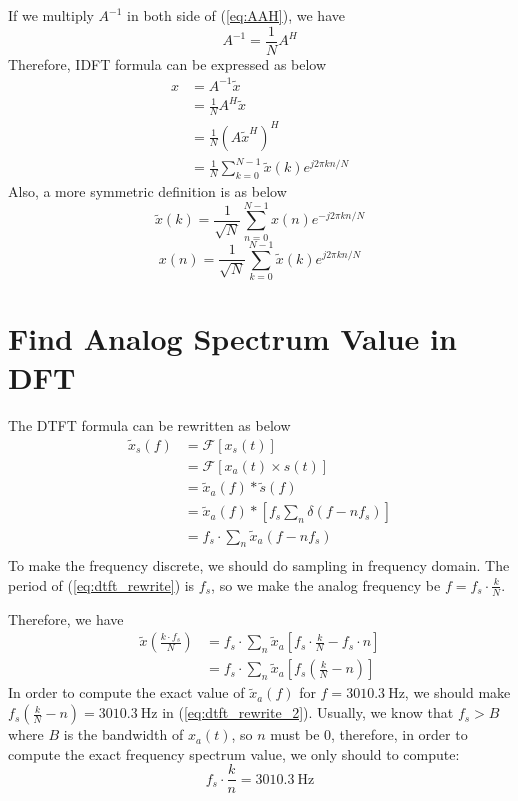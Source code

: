 \documentclass{article}
\begin{document}
If we multiply $A^{-1}$ in both side of (\ref{eq:AAH}), we have
\begin{equation}
    A^{-1} = \frac1N A^H
\label{eq:A-1}
\end{equation}
Therefore, IDFT formula can be expressed as below
\begin{equation}
    \begin{aligned}
        x &= A^{-1} \tilde{x}\\ 
        &= \frac1N A^H \tilde{x} \\ 
        &= \frac{1}{N} (A \tilde{x}^H)^H \\ 
        &= \frac{1}{N} \sum^{N - 1}_{k = 0} \tilde{x}(k)e^{j2\pi kn /N}
    \end{aligned}
\end{equation}
Also, a more symmetric definition is as below
$$
    \tilde{x}(k) = \frac{1}{\sqrt{N}} \sum_{n = 0}^{N - 1} x(n) e^{-j 2\pi kn/N}
$$
$$
    x(n) = \frac{1}{\sqrt{N}} \sum_{k = 0}^{N - 1} \tilde{x}(k) e^{j 2\pi kn/N}
$$
\section{Find Analog Spectrum Value in DFT}
The DTFT formula can be rewritten as below
\begin{equation}
\begin{aligned}
\tilde{x}_s(f) &= \mathcal{F} \left[ x_s(t) \right] \\ 
&= \mathcal{F} \left[ x_a(t) \times s(t) \right] \\ 
&= \tilde{x}_a(f) *\tilde{s}(f) \\ 
&= \tilde{x}_a(f) * \left[ f_s \sum_n \delta(f - nf_s) \right] \\
&=f_s \cdot \sum_n \tilde{x}_a(f - nf_s) \\
\end{aligned}
\label{eq:dtft_rewrite}
\end{equation}
To make the frequency discrete, we should do sampling in frequency domain. The period of (\ref{eq:dtft_rewrite}) is $f_s$, so we make the analog frequency be $f = f_s \cdot \frac k N$.

Therefore, we have
\begin{equation}
\begin{aligned}
\tilde{x}(\frac{k\cdot f_s}{N}) &= f_s \cdot \sum_n \tilde{x}_a[f_s \cdot \frac kN - f_s \cdot n] \\ 
&= f_s \cdot \sum_n \tilde{x}_a[f_s(\frac kN - n)]
\end{aligned}
\label{eq:dtft_rewrite_2}
\end{equation}
In order to compute the exact value of $\tilde{x}_a(f)$ for $f = 3010.3 ~\mathrm{Hz} $, we should make $f_s(\frac kN - n) = 3010.3 ~\mathrm{Hz}$ in (\ref{eq:dtft_rewrite_2}). Usually, we know that $f_s > B$ where $B$ is the bandwidth of $x_a(t)$, so $n$ must be $0$, therefore, in order to compute the exact frequency spectrum value, we only should to compute: 
$$
f_s\cdot \frac kn = 3010.3 ~\mathrm{Hz}
$$
\end{document}
